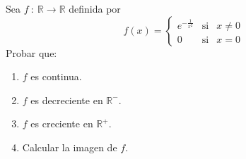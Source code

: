 \begin{ejercicio}
    Sea $f ~:~ \mathbb{R} \longrightarrow \mathbb{R}$ definida por
    \begin{equation*}
        f(x)=
        \left\{ \begin{array}{ccl}
            e^{-\frac{1}{x^2}} & \text{si} & x \neq 0 \\
            0 & \text{si} & x  = 0
        \end{array} \right.
    \end{equation*}
    Probar que:
    \begin{enumerate}
        \item $f$ es continua.
        \item $f$ es decreciente en $\mathbb{R}^{-}$.
        \item $f$ es creciente en $\mathbb{R}^{+}$.
        \item Calcular la imagen de $f$.
    \end{enumerate}
\end{ejercicio}